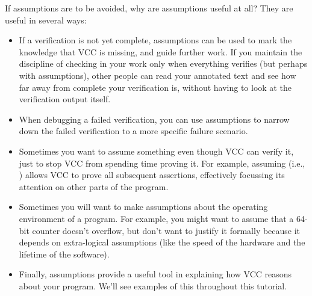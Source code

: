 If assumptions are to be avoided, why are assumptions useful at
all? They are useful in several ways:
\begin{itemize}
\item If a verification is not yet complete, assumptions can be used
  to mark the knowledge that VCC is missing, and guide further work.
  If you maintain the discipline of checking in your work only when
  everything verifies (but perhaps with assumptions), other people can
  read your annotated text and see how far away from complete your
  verification is, without having to look at the verification output
  itself.
\item When debugging a failed verification, you can use assumptions to
  narrow down the failed verification to a more specific failure
  scenario.
\item Sometimes you want to assume something even though VCC can
  verify it, just to stop VCC from spending time proving it. For
  example, assuming  (i.e., \vcc{\false}) allows VCC to prove
  all subsequent assertions, effectively focussing its attention on
  other parts of the program.
\item Sometimes you will want to make assumptions about the operating
  environment of a program. For example, you might want to assume that
  a 64-bit counter doesn't overflow, but don't want to justify it
  formally because it depends on extra-logical assumptions (like the
  speed of the hardware and the lifetime of the software). 
\item Finally, assumptions provide a useful tool in explaining how VCC
  reasons about your program. We'll see examples of this throughout
  this tutorial.
\end{itemize}



